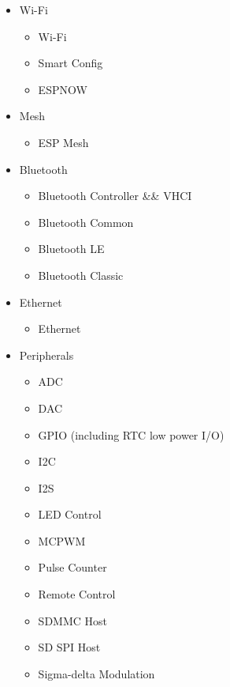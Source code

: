 \begin{multicols}{2}
    \begin{itemize}
        \item Wi-Fi
        \begin{itemize}
            \setlength\itemsep{1pt}
            \item Wi-Fi
            \item Smart Config
            \item ESPNOW
        \end{itemize}
        \item Mesh
        \begin{itemize}
            \setlength\itemsep{1pt}
            \item ESP Mesh
        \end{itemize}
        \item Bluetooth
        \begin{itemize}
            \setlength\itemsep{1pt}
            \item Bluetooth Controller \&\& VHCI
            \item Bluetooth Common
            \item Bluetooth LE
            \item Bluetooth Classic
        \end{itemize}
        \item Ethernet
        \begin{itemize}
            \setlength\itemsep{1pt}
            \item Ethernet
        \end{itemize}
        \item Peripherals
        \begin{itemize}
            \setlength\itemsep{1pt}
            \item ADC
            \item DAC
            \item GPIO (including RTC low power I/O)
            \item I2C
            \item I2S
            \item LED Control
            \item MCPWM
            \item Pulse Counter
            \item Remote Control
            \item SDMMC Host
            \item SD SPI Host
            \item Sigma-delta Modulation

\end{itemize}
\end{itemize}
\end{multicols}
